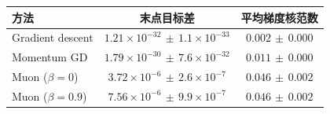 \begin{tabular}{lcc}\toprule
方法 & 末点目标差 & 平均梯度核范数 \\ \midrule
Gradient descent & $1.21\times10^{-32}\,\pm\,1.1\times10^{-33}$ & $0.002\,\pm\,0.000$ \\
Momentum GD & $1.79\times10^{-30}\,\pm\,7.6\times10^{-32}$ & $0.011\,\pm\,0.000$ \\
Muon ($\beta=0$) & $3.72\times10^{-6}\,\pm\,2.6\times10^{-7}$ & $0.046\,\pm\,0.002$ \\
Muon ($\beta=0.9$) & $7.56\times10^{-6}\,\pm\,9.9\times10^{-7}$ & $0.046\,\pm\,0.002$ \\
\bottomrule\end{tabular}
